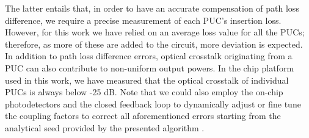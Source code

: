 The latter entails that, in order to have an accurate compensation of path loss difference, we require a precise measurement of each PUC's insertion loss.
However, for this work we have relied on an average loss value for all the PUCs; therefore, as more of these are added to the circuit, more deviation is expected.
In addition to path loss difference errors, optical crosstalk originating from a PUC can also contribute to non-uniform output powers.
In the chip platform used in this work, we have measured that the optical crosstalk of individual PUCs is always below -25 dB.
Note that we could also employ the on-chip photodetectors and the closed feedback loop to dynamically adjust or fine tune the coupling factors to correct all aforementioned errors starting from the analytical seed provided by the presented algorithm \cite{perez2017multipurpose}.
